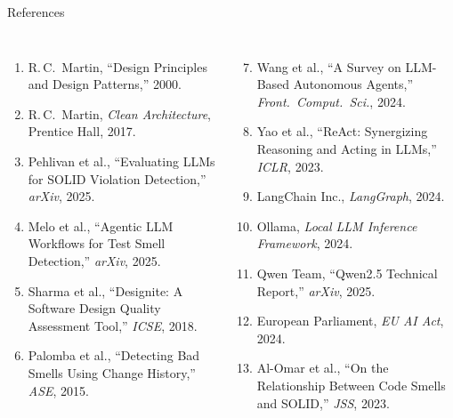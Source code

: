 \documentclass[aspectratio=169,10pt]{beamer}
\begin{document}
{
\begin{frame}{References}
  \begin{columns}[T]
      {\footnotesize
      \begin{enumerate}
        \item R.\,C.\ Martin, ``Design Principles and Design Patterns,'' 2000.
        \item R.\,C.\ Martin, \textit{Clean Architecture}, Prentice Hall, 2017.
        \item Pehlivan et al., ``Evaluating LLMs for SOLID Violation Detection,''
              \textit{arXiv}, 2025.
        \item Melo et al., ``Agentic LLM Workflows for Test Smell Detection,''
              \textit{arXiv}, 2025.
        \item Sharma et al., ``Designite: A Software Design Quality Assessment Tool,''
              \textit{ICSE}, 2018.
        \item Palomba et al., ``Detecting Bad Smells Using Change History,''
              \textit{ASE}, 2015.
      \end{enumerate}
      }
      {\footnotesize
      \begin{enumerate}\setcounter{enumi}{6}
        \item Wang et al., ``A Survey on LLM-Based Autonomous Agents,''
              \textit{Front.\ Comput.\ Sci.}, 2024.
        \item Yao et al., ``ReAct: Synergizing Reasoning and Acting in LLMs,''
              \textit{ICLR}, 2023.
        \item LangChain Inc., \textit{LangGraph}, 2024.
        \item Ollama, \textit{Local LLM Inference Framework}, 2024.
        \item Qwen Team, ``Qwen2.5 Technical Report,'' \textit{arXiv}, 2025.
        \item European Parliament, \textit{EU AI Act}, 2024.
        \item Al-Omar et al., ``On the Relationship Between Code Smells and SOLID,''
              \textit{JSS}, 2023.
      \end{enumerate}
      }
  \end{columns}
\end{frame}
}
\end{document}
